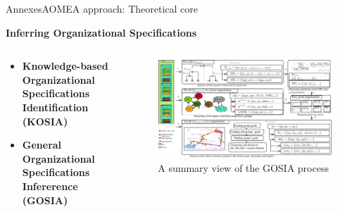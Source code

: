 \begin{frame}{Annexes}{AOMEA approach: Theoretical core}

    \textbf{Inferring Organizational Specifications}

    \begin{columns}

        \begin{column}{0.3\textwidth}

            \begin{itemize}
                \item \textbf{Knowledge-based Organizational Specifications Identification (KOSIA)}
                \item \textbf{General Organizational Specifications Infererence (GOSIA)}
            \end{itemize}

        \end{column}

        \begin{column}{0.8\textwidth}
            \begin{figure}
                \centering
                \includegraphics[width=0.95\linewidth]{figures/GOSIA_view.png}
                \caption*{A summary view of the GOSIA process}
                \label{fig:gosia_process}
            \end{figure}
        \end{column}

    \end{columns}

\end{frame}


